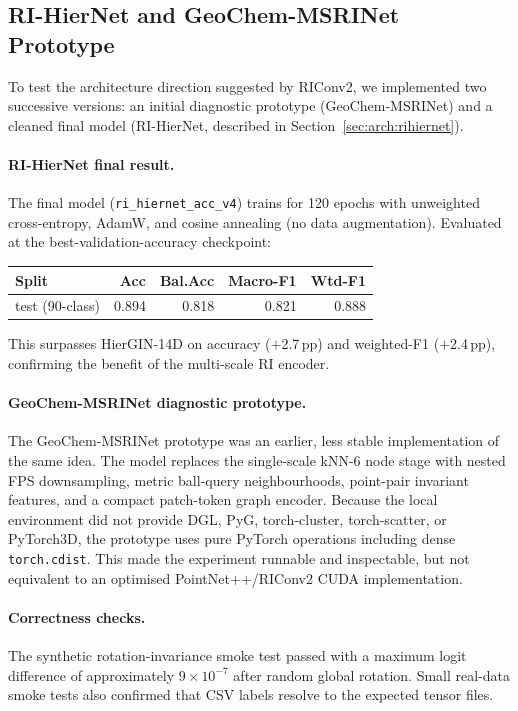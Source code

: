 \subsection{RI-HierNet and GeoChem-MSRINet Prototype}
\label{sec:results:geochem}

To test the architecture direction suggested by RIConv2, we implemented two
successive versions: an initial diagnostic prototype (GeoChem-MSRINet) and a
cleaned final model (RI-HierNet, described in Section~\ref{sec:arch:rihiernet}).

\paragraph{RI-HierNet final result.}
The final model (\texttt{ri\_hiernet\_acc\_v4}) trains for 120 epochs with unweighted
cross-entropy, AdamW, and cosine annealing (no data augmentation).
Evaluated at the best-validation-accuracy checkpoint:
\begin{center}
\begin{tabular}{lrrrr}
  \toprule
  \textbf{Split} & \textbf{Acc} & \textbf{Bal.Acc} & \textbf{Macro-F1} & \textbf{Wtd-F1} \\
  \midrule
  test (90-class) & 0.894 & 0.818 & 0.821 & 0.888 \\
  \bottomrule
\end{tabular}
\end{center}
This surpasses HierGIN-14D on accuracy ($+$2.7\,pp) and weighted-F1 ($+$2.4\,pp),
confirming the benefit of the multi-scale RI encoder.

\paragraph{GeoChem-MSRINet diagnostic prototype.}
The GeoChem-MSRINet prototype was an earlier, less stable implementation of the
same idea.
The model replaces the single-scale kNN-6 node stage with nested FPS
downsampling, metric ball-query neighbourhoods, point-pair invariant features,
and a compact patch-token graph encoder.
Because the local environment did not provide DGL, PyG, torch-cluster,
torch-scatter, or PyTorch3D, the prototype uses pure PyTorch operations
including dense \texttt{torch.cdist}.
This made the experiment runnable and inspectable, but not equivalent to an
optimised PointNet++/RIConv2 CUDA implementation.

\paragraph{Correctness checks.}
The synthetic rotation-invariance smoke test passed with a maximum logit
difference of approximately $9\times10^{-7}$ after random global rotation.
Small real-data smoke tests also confirmed that CSV labels resolve to the
expected tensor files.

